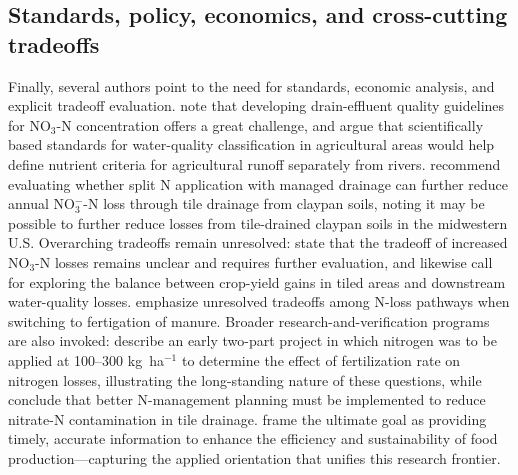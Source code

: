 \documentclass[11pt]{article}
\begin{document}
\subsection{Standards, policy, economics, and cross-cutting tradeoffs}
Finally, several authors point to the need for standards, economic analysis, and explicit tradeoff evaluation. \textcite{Elmi2004} note that developing drain-effluent quality guidelines for NO$_3$-N concentration offers a great challenge, and \textcite{Lagzdins2015} argue that scientifically based standards for water-quality classification in agricultural areas would help define nutrient criteria for agricultural runoff separately from rivers. \textcite{Nash2015d} recommend evaluating whether split N application with managed drainage can further reduce annual NO$_3^-$-N loss through tile drainage from claypan soils, noting it may be possible to further reduce losses from tile-drained claypan soils in the midwestern U.S. Overarching tradeoffs remain unresolved: \textcite{Derby2024} state that the tradeoff of increased NO$_3$-N losses remains unclear and requires further evaluation, and \textcite{Addab2022} likewise call for exploring the balance between crop-yield gains in tiled areas and downstream water-quality losses. \textcite{Gamble2018} emphasize unresolved tradeoffs among N-loss pathways when switching to fertigation of manure. Broader research-and-verification programs are also invoked: \textcite{BAKER1975} describe an early two-part project in which nitrogen was to be applied at 100--300 kg~ha$^{-1}$ to determine the effect of fertilization rate on nitrogen losses, illustrating the long-standing nature of these questions, while \textcite{Dattamudi2020} conclude that better N-management planning must be implemented to reduce nitrate-N contamination in tile drainage. \textcite{Fontes2019} frame the ultimate goal as providing timely, accurate information to enhance the efficiency and sustainability of food production---capturing the applied orientation that unifies this research frontier.

\printbibliography
\end{document}
